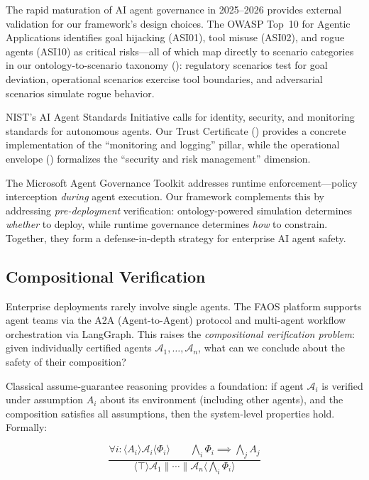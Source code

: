 \documentclass[11pt,a4paper]{article}
\newcommand{\faos}{\textsc{FAOS}}
\newcommand{\agent}{\mathcal{A}}
\begin{document}
The rapid maturation of AI agent governance in 2025--2026 provides
external validation for our framework's design choices.
The OWASP Top~10 for Agentic Applications \citep{owasp2025agentic}
identifies goal hijacking (ASI01), tool misuse (ASI02), and rogue
agents (ASI10) as critical risks---all of which map directly to
scenario categories in our ontology-to-scenario taxonomy
(): regulatory scenarios test for
goal deviation, operational scenarios exercise tool boundaries, and
adversarial scenarios simulate rogue behavior.

NIST's AI Agent Standards Initiative \citep{nist2026agents} calls
for identity, security, and monitoring standards for autonomous
agents. Our Trust Certificate ()
provides a concrete implementation of the ``monitoring and logging''
pillar, while the operational envelope
() formalizes the ``security and risk
management'' dimension.

The Microsoft Agent Governance Toolkit \citep{microsoft2026agt}
addresses runtime enforcement---policy interception \emph{during}
agent execution. Our framework complements this by addressing
\emph{pre-deployment} verification: ontology-powered simulation
determines \emph{whether} to deploy, while runtime governance
determines \emph{how} to constrain. Together, they form a
defense-in-depth strategy for enterprise AI agent safety.

\subsection{Compositional Verification}
\label{sec:compositional}

Enterprise deployments rarely involve single agents. The \faos{}
platform supports agent teams via the A2A (Agent-to-Agent) protocol
and multi-agent workflow orchestration via LangGraph. This raises the
\emph{compositional verification problem}: given individually
certified agents $\agent_1, \ldots, \agent_n$, what can we conclude
about the safety of their composition?

Classical assume-guarantee reasoning \citep{clarke2018handbook}
provides a foundation: if agent $\agent_i$ is verified under
assumption $A_i$ about its environment (including other agents),
and the composition satisfies all assumptions, then the system-level
properties hold. Formally:

\begin{equation}
  \frac{\forall i: \langle A_i \rangle \agent_i \langle \Phi_i \rangle
    \qquad \bigwedge_i \Phi_i \implies \bigwedge_j A_j}{
    \langle \top \rangle \agent_1 \| \cdots \| \agent_n
    \langle \bigwedge_i \Phi_i \rangle}
\end{equation}
\end{document}
